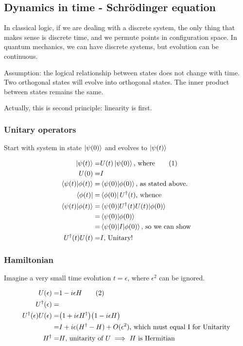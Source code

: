 \documentclass[]{article}
\newcommand\numberthis{\addtocounter{equation}{1}\tag{\theequation}}
\begin{document}
\subsection{Dynamics in time - Schr\"odinger equation}

In classical logic, if we are dealing with a discrete system, the only thing that makes sense is discrete time, and we permute points in configuration space. In quantum mechanics, we can have discrete systems, but evolution can be continuous.

Assumption: the logical relationship between states does not change with time. Two orthogonal states will evolve into orthogonal states. The inner product between states remains the same.

Actually, this is second principle: linearity is first.


\subsubsection{Unitary operators}

Start with system in state $\ket{\psi(0)}$ and evolves to $\ket{\psi(t)}$

\begin{align*}
	\ket{\psi(t)} =& U(t) \ket{\psi(0)} \text{, where} \numberthis \label{eq:evolution_time}\\
	U(0) =& I\\
	\braket{\psi(t)\vert\phi(t)} =& \braket{\psi(0)\vert\phi(0)} \text{, as stated above.}\\
	\bra{\phi(t)} =& \bra{\phi(0)} U^\dagger(t) \text{, whence}\\
	\braket{\psi(t)\vert\phi(t)} =& \braket{\psi(0)\vert U^\dagger(t) U(t)\vert\phi(0)}\\
	=& \braket{\psi(0)\vert\phi(0)} \\
	=& \braket{\psi(0)\vert I \vert \phi(0)} \text{, so we can show}\\
	 U^\dagger(t) U(t)=& I \text {, Unitary!}
\end{align*}

\subsubsection{Hamiltonian}

Imagine a very small time evolution $t=\epsilon$, where $\epsilon^2$ can be ignored.

\begin{align*}
	U(\epsilon) =& 1 - i \epsilon H \numberthis \label{eq:introducing:hamiltonian}\\
	U^\dagger (\epsilon) =& \\
	U^\dagger (\epsilon)U(\epsilon) =& \big(1 + i \epsilon H^\dagger\big)\big(1 - i \epsilon H\big)\\
	=& I + i\epsilon (H^\dagger-H) + O(\epsilon^2) \text{, which must equal I for Unitarity}\\
	H^\dagger=& H \text{, unitarity of $U\implies$ $H$ is Hermitian}
\end{align*}
\end{document}
